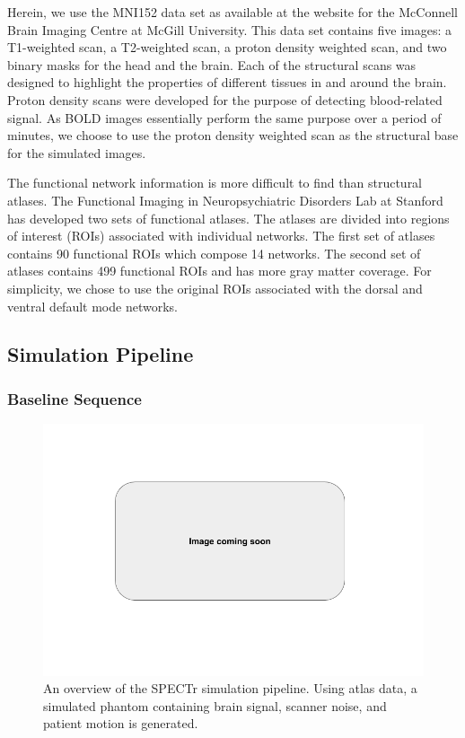 Herein, we use the MNI152 data set as available at the website for the McConnell Brain Imaging Centre at McGill University. This data set contains five images: a T1-weighted scan, a T2-weighted scan, a proton density weighted scan, and two binary masks for the head and the brain. Each of the structural scans was designed to highlight the properties of different tissues in and around the brain. Proton density scans were developed for the purpose of detecting blood-related signal. As BOLD images essentially perform the same purpose over a period of minutes, we choose to use the proton density weighted scan as the structural base for the simulated images. %

The functional network information is more difficult to find than structural atlases. The Functional Imaging in Neuropsychiatric Disorders Lab at Stanford has developed two sets of functional atlases. The atlases are divided into regions of interest (ROIs) associated with individual networks. The first set of atlases contains 90 functional ROIs which compose 14 networks. The second set of atlases contains 499 functional ROIs and has more gray matter coverage. For simplicity, we chose to use the original ROIs associated with the dorsal and ventral default mode networks.

\subsection{Simulation Pipeline}

\subsubsection{Baseline Sequence}

\begin{figure}
\centering
\includegraphics[width=.5\textwidth]{5/pipeline.png}
\caption{An overview of the SPECTr simulation pipeline. Using atlas data, a simulated phantom containing brain signal, scanner noise, and patient motion is generated.}
\label{ch5:spectr_flow}
\end{figure}

